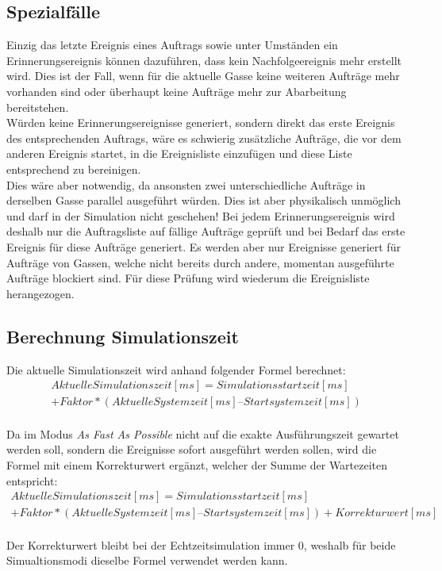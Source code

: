 \subsection{Spezialfälle}
Einzig das letzte Ereignis eines Auftrags sowie unter Umständen ein Erinnerungsereignis können dazuführen, dass kein Nachfolgeereignis mehr erstellt wird. Dies ist der Fall, wenn für die aktuelle Gasse keine weiteren Aufträge mehr vorhanden sind oder überhaupt keine Aufträge mehr zur Abarbeitung bereitstehen.\\
Würden keine Erinnerungsereignisse generiert, sondern direkt das erste Ereignis des entsprechenden Auftrags, wäre es schwierig  zusätzliche Aufträge, die vor dem anderen Ereignis startet, in die Ereignisliste einzufügen und diese Liste entsprechend zu bereinigen.\\
Dies wäre aber notwendig, da ansonsten zwei unterschiedliche Aufträge in derselben Gasse parallel ausgeführt würden. Dies ist aber physikalisch unmöglich und darf in der Simulation nicht geschehen! Bei jedem Erinnerungsereignis wird deshalb nur die Auftragsliste auf fällige Aufträge geprüft und bei Bedarf das erste Ereignis für diese Aufträge generiert. Es werden aber nur Ereignisse generiert für Aufträge von Gassen, welche nicht bereits durch andere, momentan ausgeführte Aufträge blockiert sind. Für diese Prüfung wird wiederum die Ereignisliste herangezogen.\\
%
\subsection{Berechnung Simulationszeit}
Die aktuelle Simulationszeit wird anhand folgender Formel berechnet:\\
\begin{equation}
   \begin{split}
 Aktuelle Simulationszeit [ms] = Simulationsstartzeit [ms] \\
  + Faktor * (Aktuelle Systemzeit [ms] – Startsystemzeit [ms])
     \end{split}
\end{equation}
\\
Da im Modus \textit{As Fast As Possible} nicht auf die exakte Ausführungszeit gewartet werden soll, sondern die Ereignisse sofort ausgeführt werden sollen, wird die Formel mit einem Korrekturwert ergänzt, welcher der Summe der Wartezeiten entspricht:
\\%
\begin{equation}
   \begin{split}
Aktuelle Simulationszeit [ms] = Simulationsstartzeit [ms] \\
  + Faktor * (Aktuelle Systemzeit [ms] – Startsystemzeit [ms]) + Korrekturwert [ms]
     \end{split}
  \end{equation}
\\%
Der Korrekturwert bleibt bei der Echtzeitsimulation immer 0, weshalb für beide Simualtionsmodi dieselbe Formel verwendet werden kann.
%
